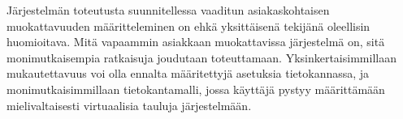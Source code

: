 Järjestelmän toteutusta suunnitellessa vaaditun asiakaskohtaisen muokattavuuden määritteleminen on ehkä yksittäisenä tekijänä oleellisin huomioitava. Mitä vapaammin asiakkaan muokattavissa järjestelmä on, sitä monimutkaisempia ratkaisuja joudutaan toteuttamaan. Yksinkertaisimmillaan mukautettavuus voi olla ennalta määritettyjä asetuksia tietokannassa, ja monimutkaisimmillaan tietokantamalli, jossa käyttäjä pystyy määrittämään mielivaltaisesti virtuaalisia tauluja järjestelmään.

\cite{weissman2010custom}